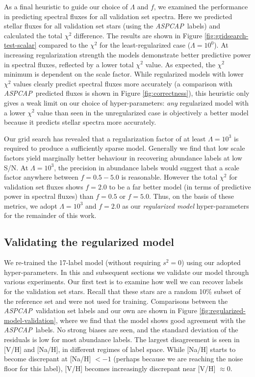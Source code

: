 \documentclass[12pt,preprint]{aastex6}
\newcommand{\project}[1]{\textsl{#1}}
\newcommand{\acronym}[1]{{\small{#1}}}
\newcommand{\aspcap}{\project{\acronym{ASPCAP}}}
\begin{document}
As a final heuristic to guide our choice of $\Lambda$ and $f$, we examined the
performance in predicting spectral fluxes for all validation set spectra.  Here 
we predicted stellar fluxes for all validation set stars (using the \aspcap\ 
labels) and calculated the total $\chi^2$ difference.  The results are shown in
Figure \ref{fig:gridsearch-test-scalar} compared to the $\chi^2$ for the least-regularized case ($\Lambda = 10^0$).  At increasing regularization strength
the models demonstrate better predictive power in spectral fluxes, reflected by
a lower total $\chi^2$ value.  As expected, the $\chi^2$ minimum is dependent on
the scale factor.  While regularized models with lower $\chi^2$ values clearly
predict spectral fluxes more accurately (a comparison with \aspcap\ predicted
fluxes is shown in Figure \ref{fig:correctness}), this heuristic only gives a 
weak limit on our choice of hyper-parameters: \emph{any} regularized model with
a lower $\chi^2$ value than seen in the unregularized case is objectively a 
better model because it predicts stellar spectra more accurately.


Our grid search has revealed that a regularization factor of at least $\Lambda = 10^3$ is
required to produce a sufficiently sparse model.  Generally we find that low
scale factors yield marginally better behaviour in recovering abundance labels
at low S/N.  At $\Lambda = 10^3$, the precision in abundance labels would 
suggest that a scale factor anywhere between $f = 0.5-5.0$ is reasonable. 
However the total $\chi^2$ for validation set fluxes shows $f = 2.0$ to be a far
better model (in terms of predictive power in spectral fluxes) than $f = 0.5$
or $f = 5.0$.  Thus, on the basis of these metrics, we adopt $\Lambda = 10^3$
and $f = 2.0$ as our \emph{regularized model} hyper-parameters for the
remainder of this work.


\subsection{Validating the regularized model}
\label{sec:model-validation}


We re-trained the 17-label model (without requiring $s^2 = 0$) using our adopted
hyper-parameters.  In this and subsequent sections we validate our model through
various experiments.  Our first test is to examine how well we can recover
labels for the validation set stars.  Recall that these stars are a random 10\%
subset of the reference set and were not used for training.  Comparisons between
the \aspcap\ validation set labels and our own are shown in Figure
\ref{fig:regularized-model-validation}, where we find that the model shows good
agreement with the \aspcap\ labels.  No strong biases are seen, and the standard
deviation of the residuals is low for most abundance labels.  The largest
disagreement is seen in [V/H] and [Na/H], in different regimes of label space.
While [Na/H] starts to become discrepant at [Na/H] $< -1$ (perhaps because we
are reaching the noise floor for this label), [V/H] becomes increasingly discrepant
near [V/H] $\approx 0$. 
\end{document}
